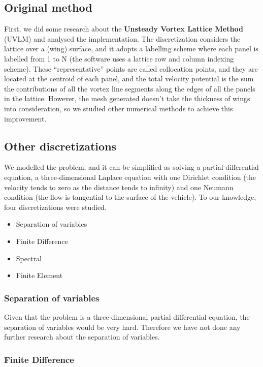 \documentclass[a4paper, 11pt, article]{report}
\begin{document}
\subsection{Original method}

First, we did some research about the \textbf{Unsteady Vortex Lattice Method} (UVLM) and analysed the implementation. The discretization considers the lattice over a (wing) surface, and it adopts a labelling scheme where each panel is labelled from 1 to N (the software uses a lattice row and column indexing scheme). These “representative” points are called collocation points, and they are located at the centroid of each panel, and the total velocity potential is the sum the contributions of all the vortex line segments along the edges of all the panels in the lattice. However, the mesh generated doesn't take the thickness of wings into consideration, so we studied other numerical methods to achieve this improvement.

\subsection{Other discretizations}

We modelled the problem, and it can be simplified as solving a partial differential equation, a three-dimensional Laplace equation with one Dirichlet condition (the velocity tends to zero as the distance tends to infinity) and one Neumann condition (the flow is tangential to the surface of the vehicle). To our knowledge, four discretizations were studied.

\begin{itemize}
\item Separation of variables
\item Finite Difference
\item Spectral
\item Finite Element
\end{itemize}

\subsubsection{Separation of variables}

Given that the problem is a three-dimensional partial differential equation, the separation of variables would be very hard. Therefore we have not done any further research about the separation of variables.

\subsubsection{Finite Difference}
\end{document}

